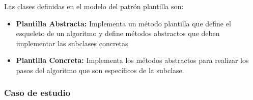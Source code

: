 Las clases definidas en el modelo del patrón plantilla son:
\begin{itemize}
	\item \textbf{Plantilla Abstracta: }Implementa un método plantilla que define el esqueleto de un algoritmo y define métodos abstractos que deben implementar las subclases concretas
	\item \textbf{Plantilla Concreta: }Implementa los métodos abstractos para realizar los pasos del algoritmo que son específicos de la subclase.
\end{itemize}

\subsubsection{Caso de estudio}


\newpage